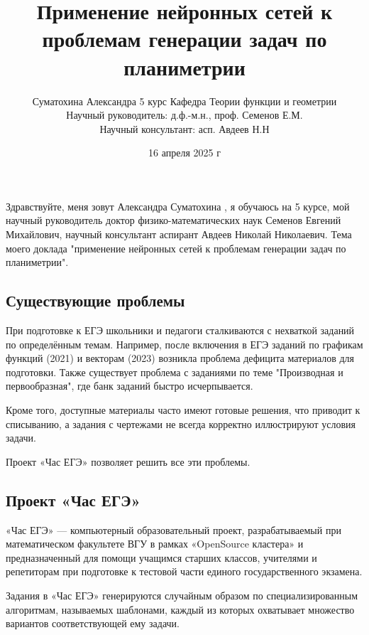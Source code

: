 \documentclass[a4paper, 12pt]{extarticle}
\title{Применение нейронных сетей к проблемам генерации
задач по планиметрии}
\author{Суматохина Александра 5 курс Кафедра Теории функции и геометрии\\Научный руководитель: д.ф.-м.н., проф. Семенов Е.М.\\Научный консультант: асп. Авдеев Н.Н}
\date{16 апреля 2025 г}
\begin{document}
\maketitle

Здравствуйте, меня зовут Александра Суматохина , я обучаюсь на 5 курсе, мой научный руководитель доктор физико-математических наук Семенов Евгений Михайлович, научный консультант аспирант Авдеев Николай Николаевич. Тема моего доклада "применение нейронных сетей к проблемам генерации задач по планиметрии".

\subsection*{Существующие проблемы}
При подготовке к ЕГЭ школьники и педагоги сталкиваются с нехваткой заданий по определённым темам. Например, после включения в ЕГЭ заданий по графикам функций (2021) и векторам (2023) возникла проблема дефицита материалов для подготовки. Также существует проблема с заданиями по теме "Производная и первообразная", где банк заданий быстро исчерпывается.

Кроме того, доступные материалы часто имеют готовые решения, что приводит к списыванию, а задания с чертежами не всегда корректно иллюстрируют условия задачи.

Проект «Час ЕГЭ» позволяет решить все эти проблемы.

\subsection*{Проект «Час ЕГЭ»}
«Час ЕГЭ» — компьютерный образовательный проект, разрабатываемый при математическом
факультете ВГУ в рамках «OpenSource кластера» и предназначенный для помощи учащимся
старших классов, учителями и репетиторам при подготовке к тестовой части единого государственного экзамена.

Задания в «Час ЕГЭ» генерируются случайным образом по специализированным алгоритмам, называемых шаблонами, каждый из которых охватывает множество вариантов соответствующей ему задачи.

\end{document}
